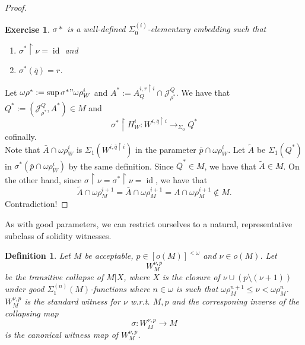 \documentclass[12pt,a4paper]{article}
\theoremstyle{nicestyle}
\newtheorem{exercise}{Exercise}[subsection]
\newtheorem{definition}{Definition}[subsection]
\DeclareMathOperator{\id}{id}
\begin{document}
\begin{proof}
        \begin{exercise}
          $\sigma*$ is a well-defined $\Sigma^{(i)}_{0}$-elementary
          embedding such that
          \begin{enumerate}
          \item $\sigma^{*} \restriction \nu = \id$ and
          \item $\sigma^{*}(\bar{q}) = r$.
          \end{enumerate}
        \end{exercise}
        Let $\omega\rho^{*} := \sup \sigma^{*}" \omega\rho^{i}_{W}$
        and
        $A^{*} := A^{i, r \restriction i}_{Q} \cap
        \mathcal{J}^{Q}_{\rho^{*}}$. We have that $Q^{*} := (\mathcal{J}^{Q}_{\rho^{*}}, A^{*}) \in M$ and
        \[
          \sigma^{*} \restriction H^{i}_{W} \colon W^{i, \bar{q} \restriction i} \to_{\Sigma_{0}} Q^{*}
        \]
        cofinally. \\
        Note that $\bar{A} \cap \omega\rho^{i}_{W}$ is
        $\Sigma_{1}(W^{i, \bar{q} \restriction i})$ in the parameter
        $\bar{p} \cap \omega\rho^{i}_{W}$. Let $\tilde{A}$ be
        $\Sigma_{1}(Q^{*})$ in
        $\sigma^{*}(\bar{p} \cap \omega\rho^{i}_{W})$ by the same
        definition. Since $\bar{Q}^{*} \in M$, we have that
        $\tilde{A} \in M$. On the other hand, since
        $\sigma \restriction \nu = \sigma^{*} \restriction \nu = \id$,
        we have that
        \[
          \tilde{A} \cap \omega\rho^{i+1}_{M} = \bar{A} \cap
          \omega\rho^{i+1}_{M} = A \cap \omega\rho^{i+1}_{M} \not \in
          M.
        \]
        Contradiction!
      \end{proof}

      As with good parameters, we can restrict ourselves to a natural,
      representative subclass of solidity witnesses.

      \begin{definition}
        Let $M$ be acceptable, $p \in [o(M)]^{<\omega}$ and $\nu \in o(M)$. Let
        \[
          W^{\nu, p}_{M}
        \]
        be the transitive collapse of $M | X$, where $X$ is the
        closure of $\nu \cup (p \setminus (\nu + 1))$ under good
        $\Sigma^{(n)}_{1}(M)$-functions where $n \in \omega$ is such
        that $\omega\rho^{n+1}_{M} \le \nu < \omega\rho^{n}_{M}$. \\
        $W^{\nu,p}_{M}$ is \emph{the standard witness for $\nu$
          w.r.t. $M,p$} and the corresponing inverse of the collapsing
        map
        \[
          \sigma \colon W^{\nu,p}_{M} \to M
        \]
        is the \emph{canonical witness map of $W^{\nu,p}_{M}$}.
      \end{definition}
\end{document}
